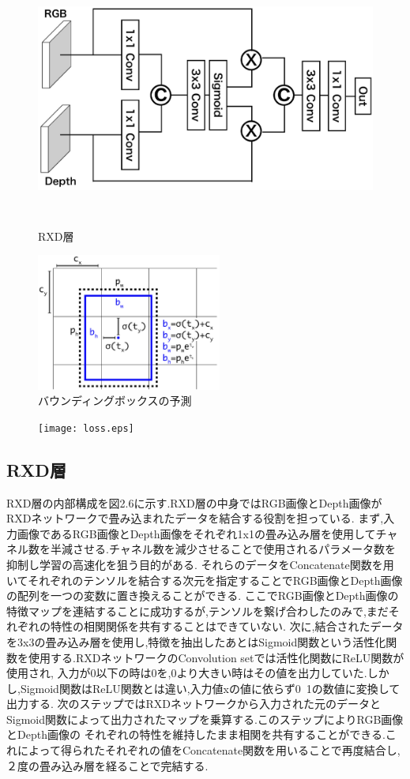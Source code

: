 \begin{figure}[htbt]
	\centering
	 \includegraphics[height=85mm]{RDXa.eps}
	 \caption{RXD層}
	 \label{fig:f2}
\end{figure}
\clearpage
\begin{figure}[htbt]
	\centering
	 \includegraphics[height=45mm]{lo.eps}
	 \caption{バウンディングボックスの予測}
	 \label{fig:f2}
\end{figure}
\begin{figure}[htbt]
	\centering
	 \texttt{[image: loss.eps]}
	 \label{fig:f2}
\end{figure}
\subsection{RXD層}
RXD層の内部構成を図2.6に示す.RXD層の中身ではRGB画像とDepth画像がRXDネットワークで畳み込まれたデータを結合する役割を担っている.
まず,入力画像であるRGB画像とDepth画像をそれぞれ1x1の畳み込み層を使用してチャネル数を半減させる.チャネル数を減少させることで使用されるパラメータ数を抑制し学習の高速化を狙う目的がある.
それらのデータをConcatenate関数を用いてそれぞれのテンソルを結合する次元を指定することでRGB画像とDepth画像の配列を一つの変数に置き換えることができる.
ここでRGB画像とDepth画像の特徴マップを連結することに成功するが,テンソルを繋げ合わしたのみで,まだそれぞれの特性の相関関係を共有することはできていない.
次に,結合されたデータを3x3の畳み込み層を使用し,特徴を抽出したあとはSigmoid関数という活性化関数を使用する.RXDネットワークのConvolution setでは活性化関数にReLU関数が使用され,
入力が0以下の時は0を,0より大きい時はその値を出力していた.しかし,Sigmoid関数はReLU関数とは違い,入力値xの値に依らず0~1の数値に変換して出力する.
次のステップではRXDネットワークから入力された元のデータとSigmoid関数によって出力されたマップを乗算する.このステップによりRGB画像とDepth画像の
それぞれの特性を維持したまま相関を共有することができる.これによって得られたそれぞれの値をConcatenate関数を用いることで再度結合し,
２度の畳み込み層を経ることで完結する.
